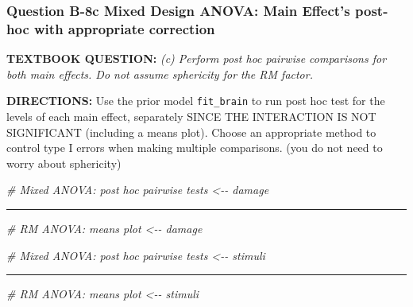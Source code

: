 \documentclass[
]{article}
\newenvironment{Shaded}{\begin{snugshade}}{\end{snugshade}}
\newcommand{\CommentTok}[1]{\textcolor[rgb]{0.56,0.35,0.01}{\textit{#1}}}
\begin{document}
\clearpage

\hypertarget{question-b-8c-mixed-design-anova-main-effects-post-hoc-with-appropriate-correction}{%
\subsubsection{Question B-8c Mixed Design ANOVA: Main Effect's post-hoc
with appropriate
correction}\label{question-b-8c-mixed-design-anova-main-effects-post-hoc-with-appropriate-correction}}

\textbf{TEXTBOOK QUESTION:} \emph{(c) Perform post hoc pairwise
comparisons for both main effects. Do not assume sphericity for the RM
factor.}

\textbf{DIRECTIONS:} Use the prior model \texttt{fit\_brain} to run post
hoc test for the levels of each main effect, separately SINCE THE
INTERACTION IS NOT SIGNIFICANT (including a means plot). Choose an
appropriate method to control type I errors when making multiple
comparisons. (you do not need to worry about sphericity)

\begin{Shaded}
\begin{Highlighting}[]
\CommentTok{\# Mixed ANOVA: post hoc pairwise tests \textless{}{-}{-} damage}
\end{Highlighting}
\end{Shaded}

\begin{center}\rule{0.5\linewidth}{0.5pt}\end{center}

\begin{Shaded}
\begin{Highlighting}[]
\CommentTok{\# RM ANOVA: means plot \textless{}{-}{-} damage}
\end{Highlighting}
\end{Shaded}

\clearpage

\begin{Shaded}
\begin{Highlighting}[]
\CommentTok{\# Mixed ANOVA: post hoc pairwise tests \textless{}{-}{-} stimuli}
\end{Highlighting}
\end{Shaded}

\begin{center}\rule{0.5\linewidth}{0.5pt}\end{center}

\begin{Shaded}
\begin{Highlighting}[]
\CommentTok{\# RM ANOVA: means plot \textless{}{-}{-} stimuli}
\end{Highlighting}
\end{Shaded}
\end{document}
